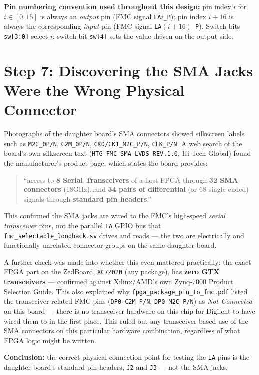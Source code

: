 \documentclass[11pt]{article}
\begin{document}
\textbf{Pin numbering convention used throughout this design:} pin index $i$ for
$i \in [0,15]$ is always an \emph{output} pin (FMC signal \texttt{LA}$i$\texttt{\_P});
pin index $i+16$ is always the corresponding \emph{input} pin
(FMC signal \texttt{LA}$(i{+}16)$\texttt{\_P}). Switch bits \texttt{sw[3:0]} select $i$;
switch bit \texttt{sw[4]} sets the value driven on the output side.

\section{Step 7: Discovering the SMA Jacks Were the Wrong Physical Connector}

Photographs of the daughter board's SMA connectors showed silkscreen labels such as
\texttt{M2C\_0P/N}, \texttt{C2M\_0P/N}, \texttt{CK0/CK1\_M2C\_P/N}, \texttt{CLK\_P/N}. A
web search of the board's own silkscreen text (\texttt{HTG-FMC-SMA-LVDS REV.1.0},
Hi-Tech Global) found the manufacturer's product page, which states the board provides:

\begin{quote}
``access to \textbf{8 Serial Transceivers} of a host FPGA through \textbf{32 SMA
connectors} (18GHz)\ldots and \textbf{34 pairs of differential} (or 68 single-ended)
signals through \textbf{standard pin headers}.''
\end{quote}

This confirmed the SMA jacks are wired to the FMC's high-speed \emph{serial transceiver}
pins, not the parallel \texttt{LA} GPIO bus that \texttt{fmc\_selectable\_loopback.sv}
drives and reads --- the two are electrically and functionally unrelated connector
groups on the same daughter board.

A further check was made into whether this even mattered practically: the exact FPGA
part on the ZedBoard, \texttt{XC7Z020} (any package), has \textbf{zero GTX transceivers}
--- confirmed against Xilinx/AMD's own Zynq-7000 Product Selection Guide. This also
explained why \texttt{fpga\_package\_pin\_to\_fmc.pdf} listed the transceiver-related FMC
pins (\texttt{DP0-C2M\_P/N}, \texttt{DP0-M2C\_P/N}) as \emph{Not Connected} on this board
--- there is no transceiver hardware on this chip for Digilent to have wired them to in
the first place. This ruled out any transceiver-based use of the SMA connectors on this
particular hardware combination, regardless of what FPGA logic might be written.

\textbf{Conclusion:} the correct physical connection point for testing the \texttt{LA}
pins is the daughter board's standard pin headers, \texttt{J2} and \texttt{J3} --- not
the SMA jacks.
\end{document}

